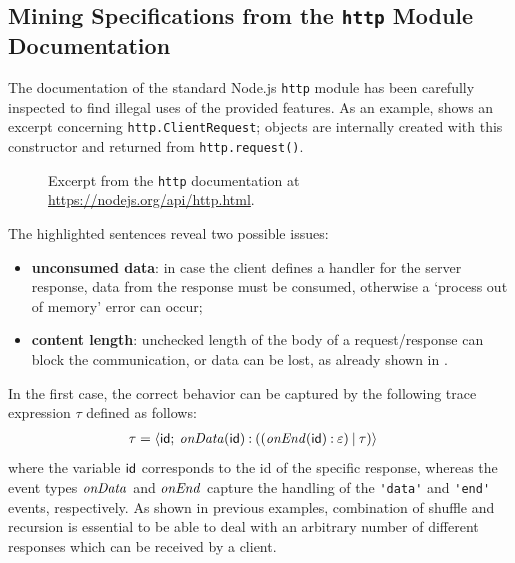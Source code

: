 \subsection{Mining Specifications from the \lstinline{http} Module Documentation}\label{sec:spec-minining}

The documentation of the standard Node.js \lstinline{http} module has been carefully inspected to find illegal uses
of the provided features.
As an example,  shows an excerpt concerning \lstinline{http.ClientRequest};
objects are internally created with this constructor and returned from \lstinline{http.request()}.
\begin{figure}
	\caption{Excerpt from the \lstinline{http} documentation at \url{https://nodejs.org/api/http.html}.}
	\label{fig:httpDoc}
\end{figure}
The highlighted sentences reveal two possible issues:
\begin{itemize}
\item \textbf{unconsumed data}: in case the client defines a handler for the server response, data from the response must be consumed,
  otherwise a `process out of memory' error can occur;
\item \textbf{content length}: unchecked length of the body of a request/response can block the communication, or data can be lost, as already shown
  in .
\end{itemize}
In the first case, the correct behavior can be captured by the following trace expression $\tau$ defined as follows:
\begin{align*}
\tau &= {\langle}\mathsf{id};\:{\mathit{onData}(\mathsf{id}) \mathbin{:} ((\mathit{onEnd}(\mathsf{id}) \mathbin{:} \varepsilon) \mathbin{|} \tau)}{\rangle}
\end{align*}
where the variable $\mathsf{id}$ corresponds to the id of the specific response, whereas the event types
$\mathit{onData}$ and $\mathit{onEnd}$ capture the handling of the \lstinline{'data'} and \lstinline{'end'} events, respectively.
As shown in previous examples, combination of shuffle and recursion is essential to be able to deal with
an arbitrary number of different responses which can be received by a client.

